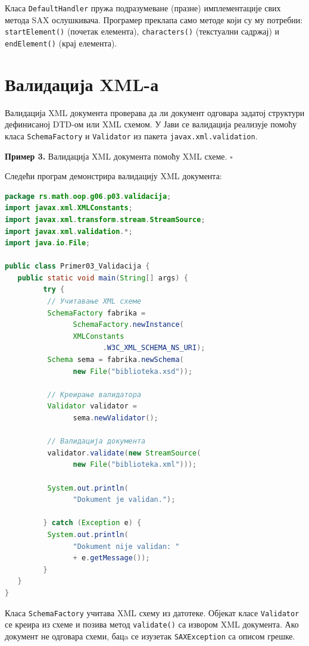 Класа \texttt{DefaultHandler} пружа подразумеване (празне) имплементације свих метода SAX ослушкивача. Програмер преклапа само методе који су му потребни: \texttt{startElement()} (почетак елемента), \texttt{characters()} (текстуални садржај) и \texttt{endElement()} (крај елемента).


\section{Валидација XML-а}

Валидација XML документа проверава да ли документ одговара задатој структури дефинисаној DTD-ом или XML схемом. У Јави се валидација реализује помоћу класа \texttt{SchemaFactory} и \texttt{Validator} из пакета \texttt{javax.xml.validation}.


\bigskip

\noindent \textbf{Пример 3.} Валидација XML документа помоћу XML схеме. $\square$

\medskip

Следећи програм демонстрира валидацију XML документа:


\begin{lstlisting}[language=Java]
package rs.math.oop.g06.p03.validacija;
import javax.xml.XMLConstants;
import javax.xml.transform.stream.StreamSource;
import javax.xml.validation.*;
import java.io.File;
 
public class Primer03_Validacija {
   public static void main(String[] args) {
         try {
          // Учитавање XML схеме
          SchemaFactory fabrika =
                SchemaFactory.newInstance(
                XMLConstants
                       .W3C_XML_SCHEMA_NS_URI);
          Schema sema = fabrika.newSchema(
                new File("biblioteka.xsd"));
 
          // Креирање валидатора
          Validator validator =
                sema.newValidator();
 
          // Валидација документа
          validator.validate(new StreamSource(
                new File("biblioteka.xml")));
 
          System.out.println(
                "Dokument je validan.");
 
         } catch (Exception e) {
          System.out.println(
                "Dokument nije validan: "
                + e.getMessage());
         }
   }
}
\end{lstlisting}


Класа \texttt{SchemaFactory} учитава XML схему из датотеке. Објекат класе \texttt{Validator} се креира из схеме и позива метод \texttt{validate()} са извором XML документа. Ако документ не одговара схеми, бацa се изузетак \texttt{SAXException} са описом грешке.


